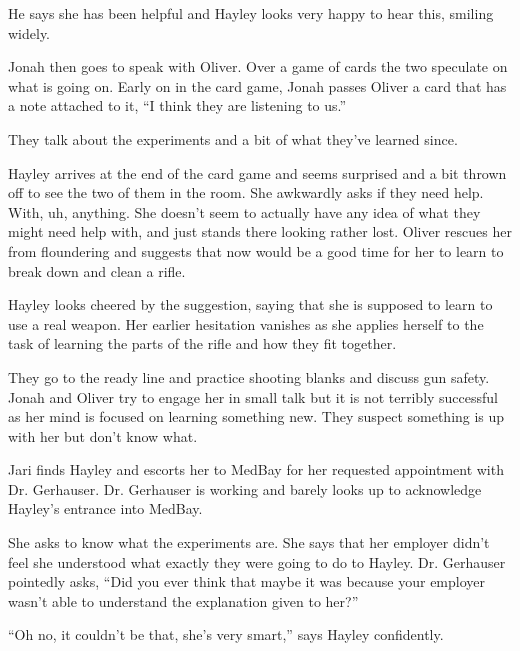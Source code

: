 He says she has been helpful and Hayley looks very happy to hear this, smiling widely.



Jonah then goes to speak with Oliver.  Over a game of cards the two speculate on what is going on.  Early on in the card game, Jonah passes Oliver a card that has a note attached to it, ``I think they are listening to us.''



They talk about the experiments and a bit of what they've learned since.



Hayley arrives at the end of the card game and seems surprised and a bit thrown off to see the two of them in the room.  She awkwardly asks if they need help.  With, uh, anything.  She doesn't seem to actually have any idea of what they might need help with, and just stands there looking rather lost.  Oliver rescues her from floundering and suggests that now would be a good time for her to learn to break down and clean a rifle.  



Hayley looks cheered by the suggestion, saying that she is supposed to learn to use a real weapon.  Her earlier hesitation vanishes as she applies herself to the task of learning the parts of the rifle and how they fit together.  



They go to the ready line and practice shooting blanks and discuss gun safety.  Jonah and Oliver try to engage her in small talk but it is not terribly successful as her mind is focused on learning something new.  They suspect something is up with her but don't know what.



Jari finds Hayley and escorts her to MedBay for her requested appointment with Dr. Gerhauser.  Dr. Gerhauser is working and barely looks up to acknowledge Hayley's entrance into MedBay.



She asks to know what the experiments are.  She says that her employer didn't feel she understood what exactly they were going to do to Hayley.  Dr. Gerhauser pointedly asks, ``Did you ever think that maybe it was because your employer wasn't able to understand the explanation given to her?''

``Oh no, it couldn't be that, she's very smart,'' says Hayley confidently.

